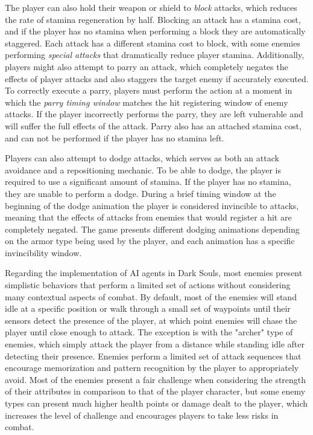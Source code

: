 The player can also hold their weapon or shield to \emph{block} attacks, which reduces the rate of stamina regeneration by half. Blocking an attack has a stamina cost, and if the player has no stamina when performing a block they are automatically staggered. Each attack has a different stamina cost to block, with some enemies performing \emph{special attacks} that dramatically reduce player stamina. Additionally, players might also attempt to parry an attack, which completely negates the effects of player attacks and also staggers the target enemy if accurately executed. To correctly execute a parry, players must perform the action at a moment in which the \emph{parry timing window} matches the hit registering window of enemy attacks. If the player incorrectly performs the parry, they are left vulnerable and will suffer the full effects of the attack. Parry also has an attached stamina cost, and can not be performed if the player has no stamina left. 

Players can also attempt to dodge attacks, which serves as both an attack avoidance and a repositioning mechanic. To be able to dodge, the player is required to use a significant amount of stamina. If the player has no stamina, they are unable to perform a dodge. During a brief timing window at the beginning of the dodge animation the player is considered invincible to attacks, meaning that the effects of attacks from enemies that would register a hit are completely negated. The game presents different dodging animations depending on the armor type being used by the player, and each animation has a specific invincibility window.

Regarding the implementation of AI agents in Dark Souls, most enemies present simplistic behaviors that perform a limited set of actions without considering many contextual aspects of combat. By default, most of the enemies will stand idle at a specific position or walk through a small set of waypoints until their sensors detect the presence of the player, at which point enemies will chase the player until close enough to attack. The exception is with the "archer" type of enemies, which simply attack the player from a distance while standing idle after detecting their presence. Enemies perform a limited set of attack sequences that encourage memorization and pattern recognition by the player to appropriately avoid. Most of the enemies present a fair challenge when considering the strength of their attributes in comparison to that of the player character, but some enemy types can present much higher health points or damage dealt to the player, which increases the level of challenge and encourages players to take less risks in combat.

